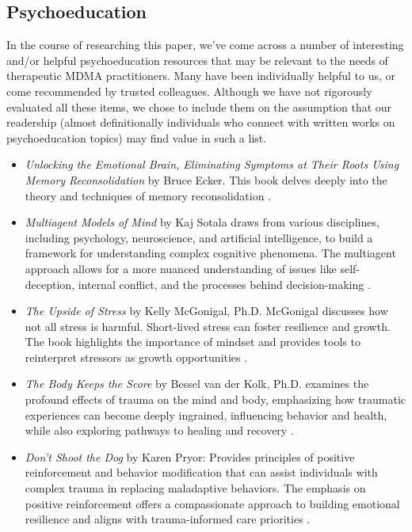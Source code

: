 \documentclass[12pt,letterpaper]{article}
\begin{document}
\subsection{Psychoeducation}
In the course of researching this paper, we've come across a number of interesting and/or helpful psychoeducation resources that may be relevant to the needs of therapeutic MDMA practitioners. Many have been individually helpful to us, or come recommended by trusted colleagues. Although we have not rigorously evaluated all these items, we chose to include them on the assumption that our readership (almost definitionally individuals who connect with written works on psychoeducation topics) may find value in such a list.
\label{resources}
\begin{itemize}
    \item \textit{Unlocking the Emotional Brain, Eliminating Symptoms at Their Roots Using Memory Reconsolidation} by Bruce Ecker. This book delves deeply into the theory and techniques of memory reconsolidation \cite{eckerUnlocking}.
    \item \textit{Multiagent Models of Mind} by Kaj Sotala draws from various disciplines, including psychology, neuroscience, and artificial intelligence, to build a framework for understanding complex cognitive phenomena. The multiagent approach allows for a more nuanced understanding of issues like self-deception, internal conflict, and the processes behind decision-making \cite{sotalaMultiagent}.
    \item \textit{The Upside of Stress} by Kelly McGonigal, Ph.D. McGonigal discusses how not all stress is harmful. Short-lived stress can foster resilience and growth. The book highlights the importance of mindset and provides tools to reinterpret stressors as growth opportunities \cite{mcgonigalStress}.
    \item \textit{The Body Keeps the Score} by Bessel van der Kolk, Ph.D. examines the profound effects of trauma on the mind and body, emphasizing how traumatic experiences can become deeply ingrained, influencing behavior and health, while also exploring pathways to healing and recovery \cite{vanderKolkBody}.
    \item \textit{Don't Shoot the Dog} by Karen Pryor: Provides principles of positive reinforcement and behavior modification that can assist individuals with complex trauma in replacing maladaptive behaviors. The emphasis on positive reinforcement offers a compassionate approach to building emotional resilience and aligns with trauma-informed care priorities \cite{pryorDog}.

\end{itemize}
\end{document}
